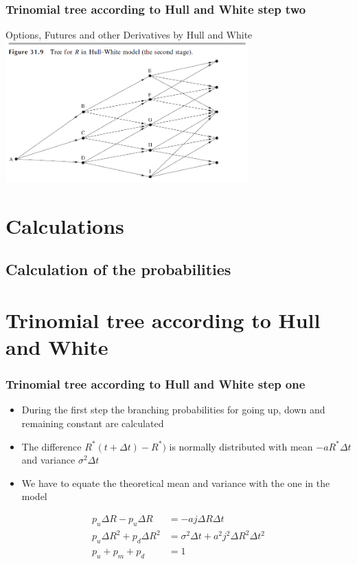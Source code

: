 \documentclass{beamer}
\begin{document}
\begin{frame}
\frametitle{Trinomial tree according to Hull and White step two}
\begin{block}{Options, Futures and other Derivatives by Hull and White}
\includegraphics[width=0.7\textwidth]{Trinomialbaum hull White step two}
\end{block}

\end{frame}



\section{Calculations}

\subsection{Calculation of the probabilities}
\section{Trinomial tree according to Hull and White} 
\begin{frame}
\frametitle{Trinomial tree according to Hull and White step one} 
\begin{itemize}
\item During the first step the branching probabilities for going up, down and remaining constant are calculated
\item The difference $R^*(t+\Delta t) - R^*)$ is normally distributed with mean $-aR^* \Delta t$ and variance $\sigma ^2 \Delta t$ 
\item We have to equate the theoretical mean and variance with the one in the model
\end{itemize}

\begin{align*}
p_u \Delta R-p_u \Delta R &= -aj\Delta R\Delta t\\
p_u\Delta R^2 + p_d \Delta R^2 &= \sigma ^2 \Delta t + a^2j^2 \Delta R^2 \Delta t^2\\
p_u + p_m + p_d &= 1
\end{align*}


\end{frame}
\end{document}
